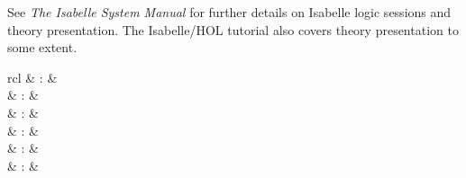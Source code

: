 \begin{isabellebody}
\begin{isamarkuptext}
  \medskip See \emph{The Isabelle System Manual} \cite{isabelle-sys}
  for further details on Isabelle logic sessions and theory
  presentation.  The Isabelle/HOL tutorial \cite{isabelle-hol-book}
  also covers theory presentation to some extent.%
\end{isamarkuptext}%
\isamarkuptrue%
%
\isamarkuptrue%
%
\begin{isamarkuptext}%
\begin{matharray}{rcl}
    \hypertarget{command.header}{\hyperlink{command.header}{\mbox{}}} & : &  \\[0.5ex]
    \hypertarget{command.chapter}{\hyperlink{command.chapter}{\mbox{}}} & : &  \\
    \hypertarget{command.section}{\hyperlink{command.section}{\mbox{}}} & : &  \\
    \hypertarget{command.subsection}{\hyperlink{command.subsection}{\mbox{}}} & : &  \\
    \hypertarget{command.subsubsection}{\hyperlink{command.subsubsection}{\mbox{}}} & : &  \\
    \hypertarget{command.text}{\hyperlink{command.text}{\mbox{}}} & : &  \\

\end{matharray}
\end{isamarkuptext}
\end{isabellebody}
